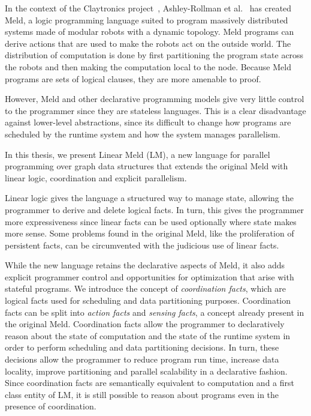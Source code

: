 In the context of the Claytronics project~\cite{goldstein-computer05},
Ashley-Rollman et al.~\cite{ashley-rollman-iclp09,
ashley-rollman-derosa-iros07wksp} has created Meld, a logic programming
language suited to program massively distributed systems made of modular
robots with a dynamic topology.  Meld programs can derive actions that are
used to make the robots act on the outside world. The distribution of
computation is done by first partitioning the program state across the
robots and then making the computation local to the node. Because Meld
programs are sets of logical clauses, they are more amenable to proof.

However, Meld and other declarative programming models give very little control
to the programmer since they are stateless languages.  This is a clear
disadvantage against lower-level abstractions, since its difficult to change how
programs are scheduled by the runtime system and how the system manages
parallelism.

In this thesis, we present Linear Meld (LM), a new language for parallel
programming over graph data structures that extends the original Meld with
linear logic, coordination and explicit parallelism.

Linear logic gives the language a structured way to manage state, allowing the
programmer to derive and delete logical facts. In turn, this gives the
programmer more expressiveness since linear facts can be used optionally where
state makes more sense. Some problems found in the original Meld, like the
proliferation of persistent facts, can be circumvented with the judicious use of
linear facts.

While the new language retains the declarative aspects of Meld, it also adds
explicit programmer control and opportunities for optimization that arise with
stateful programs.  We introduce the concept of \emph{coordination facts}, which
are logical facts used for scheduling and data partitioning purposes.
Coordination facts can be split into \emph{action facts} and \emph{sensing
facts}, a concept already present in the original Meld. Coordination facts allow
the programmer to declaratively reason about the state of computation and the
state of the runtime system in order to perform scheduling and data partitioning
decisions. In turn, these decisions allow the programmer to reduce program run
time, increase data locality, improve partitioning and parallel scalability in a
declarative fashion. Since coordination facts are semantically equivalent to
computation and a first class entity of LM, it is still possible to reason about
programs even in the presence of coordination.

